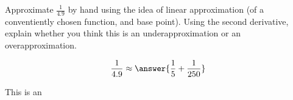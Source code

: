 \documentclass{ximera}
\author{Steven Gubkin}
\begin{document}
\begin{exercise}




Approximate $\frac{1}{4.9}$ by hand using the idea of linear approximation (of a conventiently chosen function, and base point).  Using the second derivative, explain whether you think this is an underapproximation or an overapproximation.

\begin{prompt}
	$$\frac{1}{4.9} \approx \answer{\frac{1}{5}+\frac{1}{250}}$$

This is an
\begin{multipleChoice}
\end{multipleChoice}
\end{prompt}

\end{exercise}
\end{document}
